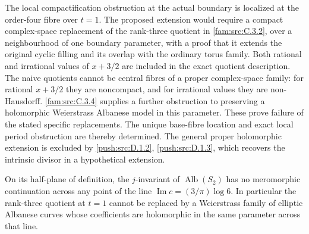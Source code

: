 The local compactification obstruction at the actual boundary is localized at the order-four fibre over $t=1$. The proposed extension would require a compact complex-space replacement of the rank-three
quotient in \ref{fam:src:C.3.2}, over a neighbourhood of one boundary parameter,
with a proof that it extends the original cyclic filling and its overlap
with the ordinary torus family. Both rational and irrational values of
$x+3/2$ are included in the exact quotient description. The naive
quotients cannot be central fibres of a proper complex-space family:
for rational $x+3/2$ they are noncompact, and for irrational values
they are non-Hausdorff. \ref{fam:src:C.3.4} supplies a further obstruction to preserving
a holomorphic Weierstrass Albanese model in this parameter.
These prove failure of the stated specific replacements. The unique base-fibre location and exact local period obstruction are thereby determined. The general proper holomorphic extension is excluded by \cref{push:src:D.1.2}, \cref{push:src:D.1.3}, which recovers the intrinsic divisor in a hypothetical extension.





\begin{proposition}\hypertarget{tag-01QP}{}\label{fam:src:C.3.4}\label{fam:st:C.3.4}

On its half-plane of definition, the $j$-invariant of
$\operatorname{Alb}(S_2)$ has no meromorphic continuation across any
point of the line
$\operatorname{Im}c=(3/\pi)\log6$. In particular the rank-three quotient
at $t=1$ cannot be replaced by a Weierstrass family of elliptic Albanese
curves whose coefficients are holomorphic in the same parameter across
that line.
\end{proposition}


